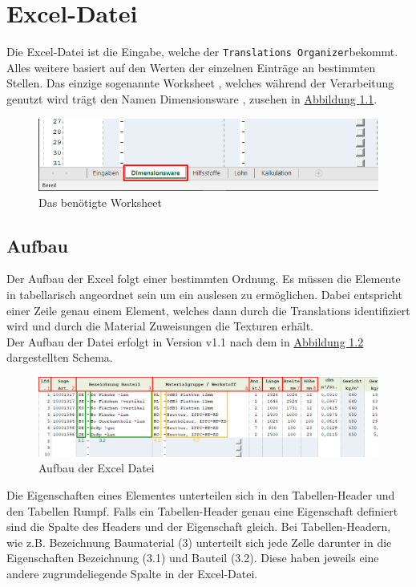 \documentclass{book}
\newcommand{\assisttool}{\texttt{Translations Organizer}}
\begin{document}
	\chapter{Excel-Datei}\label{excel}
		Die Excel-Datei ist die Eingabe, welche der \assisttool bekommt. Alles weitere basiert auf den Werten der einzelnen Einträge an bestimmten Stellen. Das einzige sogenannte \glqq Worksheet \grqq, welches während der Verarbeitung genutzt wird trägt den Namen \glqq Dimensionsware \grqq, zusehen in \hyperref[fig:dimensionsware worksheet]{Abbildung \ref{fig:dimensionsware worksheet}}.		
		\begin{figure}[H]
			\centering
			\includegraphics[scale=0.48]{pics/excel/reiter_auswaehlen.png}
			\caption{Das benötigte \glqq Worksheet \grqq}
			\label{fig:dimensionsware worksheet}
		\end{figure}
		
		\section{Aufbau}
			Der Aufbau der Excel folgt einer bestimmten Ordnung. Es müssen die Elemente in tabellarisch angeordnet sein um ein auslesen zu ermöglichen. Dabei entspricht einer Zeile genau einem Element, welches dann durch die Translations identifiziert wird und durch die Material Zuweisungen die Texturen erhält. \\
			Der Aufbau der Datei erfolgt in Version v1.1 nach dem in \hyperref[fig:excel file]{Abbildung \ref{fig:excel file}} dargestellten Schema.
			
			\begin{figure}[H]
				\centering
				\includegraphics[scale=0.48]{pics/excel/dimensionsware.png}
				\caption{Aufbau der Excel Datei}
				\label{fig:excel file}
			\end{figure}
		
			Die Eigenschaften eines Elementes unterteilen sich in den Tabellen-Header und den Tabellen Rumpf. Falls ein Tabellen-Header genau eine Eigenschaft definiert sind die Spalte des Headers und der Eigenschaft gleich. Bei Tabellen-Headern, wie z.B. \glqq Bezeichnung Baumaterial \grqq (3) unterteilt sich jede Zelle darunter in die Eigenschaften \glqq Bezeichnung \grqq (3.1) und \glqq Bauteil \grqq (3.2). Diese haben jeweils eine andere zugrundeliegende Spalte in der Excel-Datei.\\
			
\end{document}

